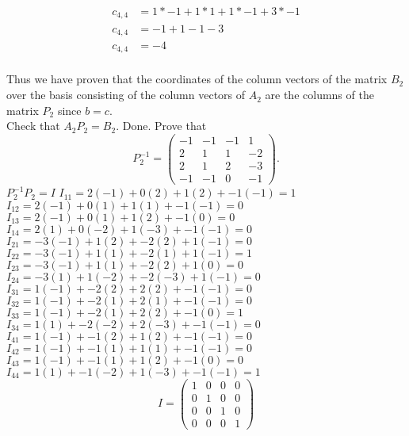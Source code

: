 \documentclass[12pt]{article}
\begin{document}
\begin{itemize}
\begin{align*}
    c_{4,4} &= 1 * -1 + 1 * 1 + 1 * -1 + 3 * -1 \\
    c_{4,4} &= -1 + 1 - 1 - 3 \\
    c_{4,4} &= -4  \\
\end{align*}

Thus we have proven that the coordinates of the column vectors of the matrix $B_2$ over the basis consisting of the column vectors of $A_2$ are the columns of the matrix $P_2$ since $b = c$. \\


Check that $A_2P_2 = B_2$.
\newline Done.
\newline Prove that
\[
P_2^{-1} = 
\begin{pmatrix}
-1 & -1 & -1 & 1\\
2 & 1 & 1 & -2 \\
2 & 1 & 2 & -3 \\
-1 & -1 & 0 & -1
\end{pmatrix} .
\]
$P_2^{-1}P_2=I$
\newline $I_{11}=2(-1)+0(2)+1(2)+-1(-1)=1$
\newline $I_{12}=2(-1)+0(1)+1(1)+-1(-1)=0$
\newline $I_{13}=2(-1)+0(1)+1(2)+-1(0)=0$
\newline $I_{14}=2(1)+0(-2)+1(-3)+-1(-1)=0$
\newline $I_{21}=-3(-1)+1(2)+-2(2)+1(-1)=0$
\newline $I_{22}=-3(-1)+1(1)+-2(1)+1(-1)=1$
\newline $I_{23}=-3(-1)+1(1)+-2(2)+1(0)=0$
\newline $I_{24}=-3(1)+1(-2)+-2(-3)+1(-1)=0$
\newline $I_{31}=1(-1)+-2(2)+2(2)+-1(-1)=0$
\newline $I_{32}=1(-1)+-2(1)+2(1)+-1(-1)=0$
\newline $I_{33}=1(-1)+-2(1)+2(2)+-1(0)=1$
\newline $I_{34}=1(1)+-2(-2)+2(-3)+-1(-1)=0$
\newline $I_{41}=1(-1)+-1(2)+1(2)+-1(-1)=0$
\newline $I_{42}=1(-1)+-1(1)+1(1)+-1(-1)=0$
\newline $I_{43}=1(-1)+-1(1)+1(2)+-1(0)=0$
\newline $I_{44}=1(1)+-1(-2)+1(-3)+-1(-1)=1$
\[
I = 
\begin{pmatrix}
1 & 0 & 0 & 0\\
0 & 1 & 0 & 0 \\
0 & 0 & 1 & 0 \\
0 & 0 & 0 & 1
\end{pmatrix}
\]


\end{itemize}
\end{document}

